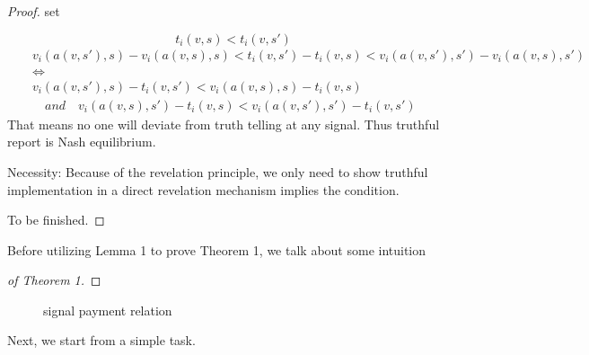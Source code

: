 \begin{prop}
\begin{proof}
set 

$$t_i(v,s)<t_i(v,s')$$
\begin{eqnarray*}
&& v_i(a(v,s'),s)-v_i(a(v,s), s)<t_i(v,s')-t_i(v,s)<v_i(a(v,s'),s')-v_i(a(v,s), s') \\
 && \Longleftrightarrow \\
&& v_i(a(v,s'),s)-t_i(v,s')<v_i(a(v,s), s)-t_i(v,s) \\
&& \quad and\quad v_i(a(v,s), s')-t_i(v,s)<v_i(a(v,s'),s')-t_i(v,s')
\end{eqnarray*}
 That means no one will deviate from truth telling at any signal. Thus truthful report is Nash equilibrium.

 Necessity: Because of the revelation principle, we only need to show truthful implementation in a direct revelation
 mechanism implies the condition.
 
 To be finished.
\end{proof}
Before utilizing Lemma 1 to prove Theorem 1, we talk about some intuition 
\begin{proof}[of Theorem 1]
 
\end{proof}

\begin{figure}
  \caption{signal payment relation}

 \end{figure}
 Next, we start from a simple task.

\end{prop}
